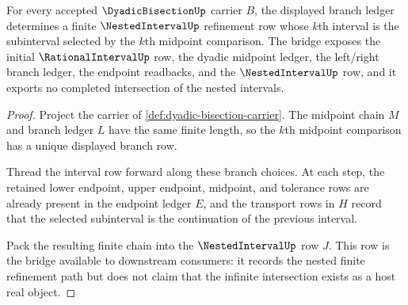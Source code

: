 \begin{theorem}
\label{thm:dyadic-bisection-nested-interval-bridge}
For every accepted $\DyadicBisectionUp$ carrier $B$, the displayed branch ledger determines a finite $\NestedIntervalUp$ refinement row whose $k$th interval is the subinterval selected by the $k$th midpoint comparison. The bridge exposes the initial $\RationalIntervalUp$ row, the dyadic midpoint ledger, the left/right branch ledger, the endpoint readbacks, and the $\NestedIntervalUp$ row, and it exports no completed intersection of the nested intervals.
\end{theorem}
\begin{proof}
Project the carrier of \autoref{def:dyadic-bisection-carrier}. The midpoint chain $M$ and branch ledger $L$ have the same finite length, so the $k$th midpoint comparison has a unique displayed branch row.

Thread the interval row forward along these branch choices. At each step, the retained lower endpoint, upper endpoint, midpoint, and tolerance rows are already present in the endpoint ledger $E$, and the transport rows in $H$ record that the selected subinterval is the continuation of the previous interval.

Pack the resulting finite chain into the $\NestedIntervalUp$ row $J$. This row is the bridge available to downstream consumers: it records the nested finite refinement path but does not claim that the infinite intersection exists as a host real object.
\end{proof}

